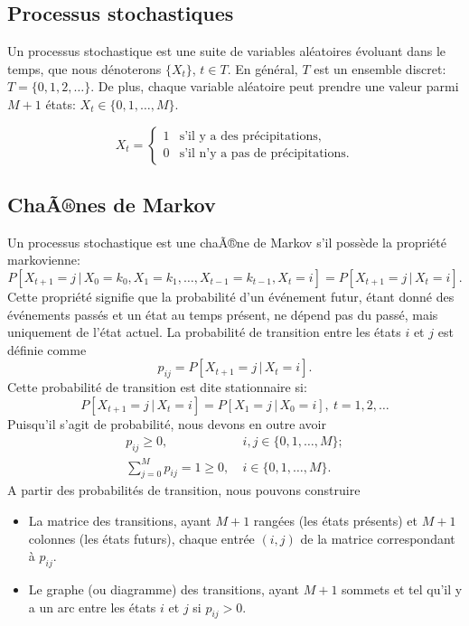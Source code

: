 \subsection{Processus stochastiques}

Un processus stochastique est une suite de variables aléatoires évoluant dans le temps, que nous dénoterons $\lbrace X_t \rbrace$, $t \in T$.
En général, $T$ est un ensemble discret: $T = \lbrace 0,1,2,\ldots \rbrace$.
De plus, chaque variable aléatoire peut prendre une valeur parmi $M+1$ états: $X_t \in \lbrace 0,1,\ldots,M \rbrace$.
 
\begin{example}
\[
X_t =
\begin{cases}
 1 & \mbox{s'il y a des précipitations,} \\
 0 & \mbox{s'il n'y a pas de précipitations}.
\end{cases}
\]
\end{example}

\subsection{ChaÃ®nes de Markov}

Un processus stochastique est une chaÃ®ne de Markov s'il possède la propriété markovienne:
\[
P[ X_{t+1} = j\,|\, X_0 = k_0, X_1 = k_1,\ldots,X_{t-1}=k_{t-1},X_t = i]
= P[ X_{t+1} = j\,|\, X_t = i ].
\]
Cette propriété signifie que la probabilité d'un événement futur, étant donné des événements passés et un état au temps présent, ne dépend pas du passé, mais uniquement de l'état actuel.
La probabilité de transition entre les états $i$ et $j$ est définie comme
\[
p_{ij} = P[X_{t+1} = j \,|\, X_t = i].
\]
Cette probabilité de transition est dite stationnaire si:
\[
P[X_{t+1} = j \,|\, X_t = i] = P[X_1 = j\,|\,X_0 = i],\ t = 1,2,\ldots
\]
Puisqu'il s'agit de probabilité, nous devons en outre avoir
\begin{align*}
p_{ij} \geq 0,\ & i,j \in \lbrace 0,1,\ldots,M \rbrace;\\
\sum_{j = 0}^M p_{ij} = 1 \geq 0,\ & i \in \lbrace 0,1,\ldots,M \rbrace.
\end{align*}
A partir des probabilités de transition, nous pouvons construire
\begin{itemize}
\item
La matrice des transitions, ayant $M+1$ rangées (les états présents) et $M+1$ colonnes (les états futurs), chaque entrée $(i,j)$ de la matrice correspondant à $p_{ij}$.
\item
Le graphe (ou diagramme) des transitions, ayant $M+1$ sommets et tel qu'il y a un arc entre les états $i$ et $j$ si $p_{ij} > 0$.
\end{itemize}

